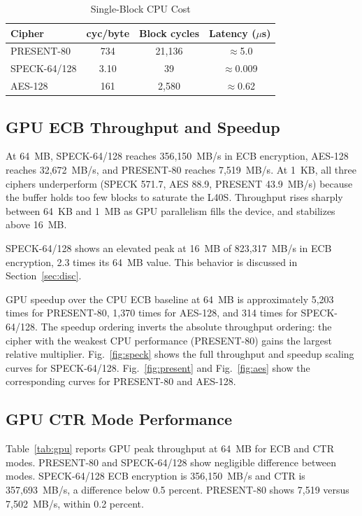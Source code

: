 \documentclass[conference]{IEEEtran}
\begin{document}
\begin{table}[t]
\caption{Single-Block CPU Cost}
\label{tab:latency}
\begin{center}
\begin{tabular}{|l|c|c|c|}
\hline
\textbf{Cipher} & \textbf{cyc/byte} & \textbf{Block cycles} & \textbf{Latency ($\mu$s)} \\
\hline
PRESENT-80    & 734  & 21,136 & $\approx$5.0   \\
SPECK-64/128  & 3.10 & 39     & $\approx$0.009 \\
AES-128       & 161  & 2,580  & $\approx$0.62  \\
\hline
\end{tabular}
\end{center}
\end{table}

\subsection{GPU ECB Throughput and Speedup}

At 64~MB, SPECK-64/128 reaches 356,150~MB/s in ECB encryption, AES-128 reaches 32,672~MB/s, and
PRESENT-80 reaches 7,519~MB/s. At 1~KB, all three ciphers underperform (SPECK 571.7, AES 88.9,
PRESENT 43.9~MB/s) because the buffer holds too few blocks to saturate the L40S. Throughput rises
sharply between 64~KB and 1~MB as GPU parallelism fills the device, and stabilizes above 16~MB.

SPECK-64/128 shows an elevated peak at 16~MB of 823,317~MB/s in ECB encryption, 2.3 times its
64~MB value. This behavior is discussed in Section~\ref{sec:disc}.

GPU speedup over the CPU ECB baseline at 64~MB is approximately 5,203 times for PRESENT-80, 1,370
times for AES-128, and 314 times for SPECK-64/128. The speedup ordering inverts the absolute
throughput ordering: the cipher with the weakest CPU performance (PRESENT-80) gains the largest
relative multiplier. Fig.~\ref{fig:speck} shows the full throughput and speedup scaling curves for SPECK-64/128.
Fig.~\ref{fig:present} and Fig.~\ref{fig:aes} show the corresponding curves for PRESENT-80
and AES-128.

\subsection{GPU CTR Mode Performance}

Table~\ref{tab:gpu} reports GPU peak throughput at 64~MB for ECB and CTR modes. PRESENT-80 and
SPECK-64/128 show negligible difference between modes. SPECK-64/128 ECB encryption is 356,150~MB/s
and CTR is 357,693~MB/s, a difference below 0.5 percent. PRESENT-80 shows 7,519 versus 7,502~MB/s,
within 0.2 percent.
\end{document}
